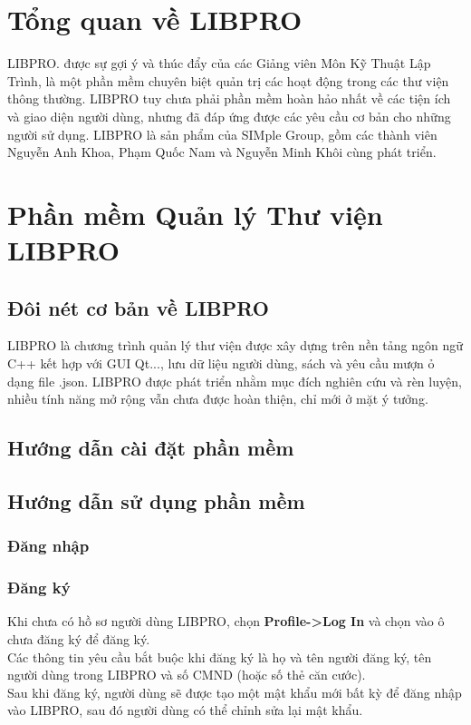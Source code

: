 \documentclass[12pt,a4paper]{report}
\begin{document}
\chapter{Tổng quan về LIBPRO}
LIBPRO. được sự gợi ý và thúc đẩy của các Giảng viên Môn Kỹ Thuật Lập Trình, là một phần mềm chuyên biệt quản trị các hoạt động trong các thư viện thông thường. LIBPRO tuy chưa phải phần mềm hoàn hảo nhất về các tiện ích và giao diện người dùng, nhưng đã đáp ứng được các yêu cầu cơ bản cho những người sử dụng. LIBPRO là sản phẩm của SIMple Group, gồm các thành viên Nguyễn Anh Khoa, Phạm Quốc Nam và Nguyễn Minh Khôi cùng phát triển.
\chapter{Phần mềm Quản lý Thư viện LIBPRO}
	\section{Đôi nét cơ bản về LIBPRO}
	LIBPRO là chương trình quản lý thư viện được xây dựng trên nền tảng ngôn ngữ C++ kết hợp với GUI Qt..., lưu dữ liệu người dùng, sách và yêu cầu mượn ỏ dạng file .json. LIBPRO được phát triển nhằm mục đích nghiên cứu và rèn luyện, nhiều tính năng mở rộng vẫn chưa được hoàn thiện, chỉ mới ở mặt ý tưởng.
	\section{Hướng dẫn cài đặt phần mềm}
	\section{Hướng dẫn sử dụng phần mềm}
		\subsection{Đăng nhập}
			\subsection{Đăng ký}
			Khi chưa có hồ sơ người dùng LIBPRO, chọn \textbf{Profile->Log In} và chọn vào ô chưa đăng ký để đăng ký.\\
			Các thông tin yêu cầu bắt buộc khi đăng ký là họ và tên người đăng ký, tên người dùng trong LIBPRO và số CMND (hoặc số thẻ căn cước).\\
			Sau khi đăng ký, người dùng sẽ được tạo một mật khẩu mới bất kỳ để đăng nhập vào LIBPRO, sau đó người dùng có thể chỉnh sửa lại mật khẩu.\\
\end{document}
